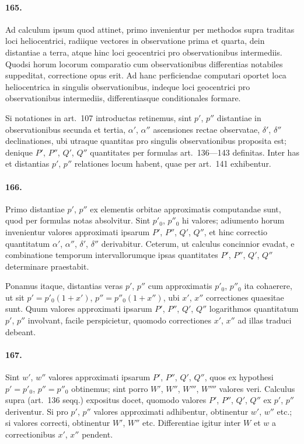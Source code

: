 \documentclass[12pt,a4paper]{article}
\begin{document}
\paragraph{165.}
Ad calculum ipsum quod attinet, primo invenientur per methodos supra traditas loci heliocentrici, radiique vectores in observatione prima et quarta, dein distantiae a terra, atque hinc loci geocentrici pro observationibus intermediis. Quodsi horum locorum comparatio cum observationibus differentias notabiles suppeditat, correctione opus erit. Ad hanc perficiendae computari oportet loca heliocentrica in singulis observationibus, indeque loci geocentrici pro observationibus intermediis, differentiasque conditionales formare.

Si notationes in art.~107 introductas retinemus, sint $p'$, $p''$ distantiae in observationibus secunda et tertia, $\alpha'$, $\alpha''$ ascensiones rectae observatae, $\delta'$, $\delta''$ declinationes, ubi utraque quantitas pro singulis observationibus proposita est; denique $P'$, $P''$, $Q'$, $Q''$ quantitates per formulas art.~136---143 definitas. Inter has et distantias $p'$, $p''$ relationes locum habent, quae per art.~141 exhibentur.

\paragraph{166.}
Primo distantiae $p'$, $p''$ ex elementis orbitae approximatis computandae sunt, quod per formulas notas absolvitur. Sint $p'_0$, $p''_0$ hi valores; adiumento horum invenientur valores approximati ipsarum $P'$, $P''$, $Q'$, $Q''$, et hinc correctio quantitatum $\alpha'$, $\alpha''$, $\delta'$, $\delta''$ derivabitur. Ceterum, ut calculus concinnior evadat, e combinatione temporum intervallorumque ipsas quantitates $P'$, $P''$, $Q'$, $Q''$ determinare praestabit.

Ponamus itaque, distantias veras $p'$, $p''$ cum approximatis $p'_0$, $p''_0$ ita cohaerere, ut sit $p' = p'_0(1 + x')$, $p'' = p''_0(1 + x'')$, ubi $x'$, $x''$ correctiones quaesitae sunt. Quum valores approximati ipsarum $P'$, $P''$, $Q'$, $Q''$ logarithmos quantitatum $p'$, $p''$ involvant, facile perspicietur, quomodo correctiones $x'$, $x''$ ad illas traduci debeant.

\paragraph{167.}
Sint $w'$, $w''$ valores approximati ipsarum $P'$, $P''$, $Q'$, $Q''$, quos ex hypothesi $p' = p'_0$, $p'' = p''_0$ obtinemus; sint porro $W'$, $W''$, $W'''$, $W''''$ valores veri. Calculus supra (art.~136 seqq.) expositus docet, quomodo valores $P'$, $P''$, $Q'$, $Q''$ ex $p'$, $p''$ deriventur. Si pro $p'$, $p''$ valores approximati adhibentur, obtinentur $w'$, $w''$ etc.; si valores correcti, obtinentur $W'$, $W''$ etc. Differentiae igitur inter $W$ et $w$ a correctionibus $x'$, $x''$ pendent.
\end{document}
